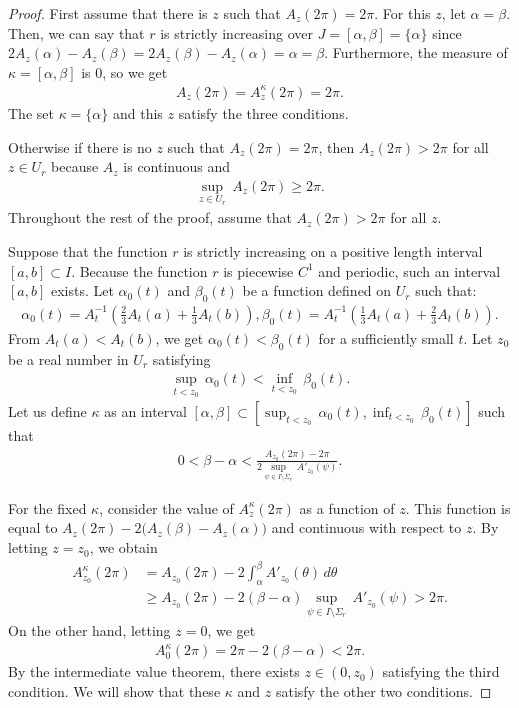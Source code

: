 \documentclass{amsart}
\theoremstyle{plain}
\theoremstyle{definition}
\theoremstyle{remark}
\begin{document}
\begin{proof}%
First assume that there is $z$ such that $A_z(2\pi)=2\pi$.
For this $z$, let $\alpha=\beta$.
Then, we can say that $r$ is strictly increasing over $J=[\alpha,\beta]=\{\alpha\}$ since $2A_z(\alpha)-A_z(\beta)=2A_z(\beta)-A_z(\alpha)=\alpha=\beta$.
Furthermore, the measure of $\kappa=[\alpha,\beta]$ is $0$, so we get
\begin{align*}
A_z(2\pi)=A_z^{\kappa}(2\pi)=2\pi.
\end{align*}
The set $\kappa=\{\alpha\}$ and this $z$ satisfy the three conditions.

Otherwise if there is no $z$ such that $A_z(2\pi)=2\pi$, then $A_z(2\pi)>2\pi$ for all $z\in U_r$ because $A_z$ is continuous and
\begin{align*}
\sup_{z\in U_r}\,A_z(2\pi)\ge2\pi.
\end{align*}
Throughout the rest of the proof, assume that $A_z(2\pi)>2\pi$ for all $z$.

Suppose that the function $r$ is strictly increasing on a positive length interval $[a,b]\subset I$.
Because the function $r$ is piecewise $C^1$ and periodic, such an interval $[a,b]$ exists.
Let $\alpha_0(t)$ and $\beta_0(t)$ be a function defined on $U_r$ such that:
\begin{align*}
\alpha_0(t)=A_t^{-1}\left(\frac23A_t(a)+\frac13A_t(b)\right),\beta_0(t)=A_t^{-1}\left(\frac13A_t(a)+\frac23A_t(b)\right).
\end{align*}
From $A_t(a)<A_t(b)$, we get $\alpha_0(t)<\beta_0(t)$ for a sufficiently small $t$.
Let $z_0$ be a real number in $U_r$ satisfying
\begin{align*}
\sup_{t<z_0}\,\alpha_0(t)<\inf_{t<z_0}\,\beta_0(t).
\end{align*}
Let us define $\kappa$ as an interval $[\alpha,\beta]\subset\left[\sup_{t<z_0}\,\alpha_0(t),\inf_{t<z_0}\,\beta_0(t)\right]$ such that
\begin{align*}
0<\beta-\alpha<\frac{A_{z_0}(2\pi)-2\pi}{2\sup_{\psi\in I\setminus\Sigma_r}\,A'_{z_0}(\psi)}.
\end{align*}

For the fixed $\kappa$, consider the value of $A_z^{\kappa}(2\pi)$ as a function of $z$.
This function is equal to $A_z(2\pi)-2\bigl(A_z(\beta)-A_z(\alpha)\bigr)$ and continuous with respect to $z$.
By letting $z=z_0$, we obtain
\begin{align*}
A_{z_0}^{\kappa}(2\pi)
&= A_{z_0}(2\pi)-2\int_{\alpha}^{\beta}A'_{z_0}(\theta)\,d\theta \\
&\ge A_{z_0}(2\pi)-2(\beta-\alpha)\sup_{\psi\in I\setminus\Sigma_r}\,A'_{z_0}(\psi) >2\pi.
\end{align*}
On the other hand, letting $z=0$, we get
\begin{align*}
A_0^{\kappa}(2\pi)=2\pi-2(\beta-\alpha)<2\pi.
\end{align*}
By the intermediate value theorem, there exists $z\in(0,z_0)$ satisfying the third condition.
We will show that these $\kappa$ and $z$ satisfy the other two conditions.


\end{proof}
\end{document}
